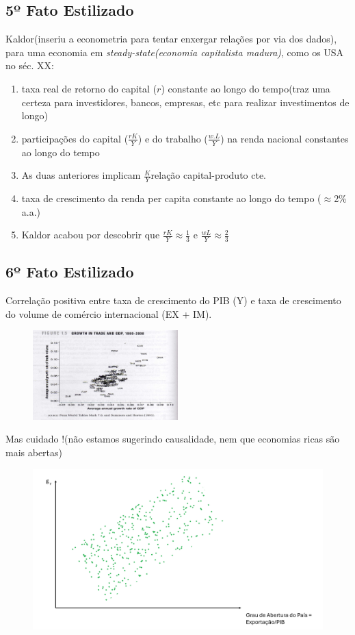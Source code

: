 \documentclass[a4paper,12pt]{article}[abntex2]
\begin{document}
\subsection{\textbf{5º Fato Estilizado}}
Kaldor(inseriu a econometria para tentar enxergar relações por via dos dados), para uma economia em \textit{steady-state(economia capitalista madura)}, como os USA no séc. XX:\begin{enumerate}
    \item taxa real de retorno do capital ($r$) constante ao longo do tempo(traz uma certeza para investidores, bancos, empresas, etc para realizar investimentos de longo)
    \item participações do capital ($\frac{rK}{Y}$) e do trabalho ($\frac{w.L}{Y}$) na renda nacional constantes ao longo do tempo
    \item As duas anteriores implicam $\frac{K}{Y}$relação capital-produto cte.
    \item taxa de crescimento da renda per capita constante ao longo do tempo ($\approx$2\% a.a.)  \item Kaldor acabou por descobrir que $\frac{rK}{Y} \approx\frac{1}{3}$ e $\frac{wL}{Y} \approx\frac{2}{3}$
\end{enumerate}

\subsection{\textbf{6º Fato Estilizado}}
Correlação positiva entre taxa de crescimento do PIB (Y) e taxa de crescimento do volume de comércio internacional (EX + IM).

\begin{figure}[H]
        \centering
        \includegraphics[width=0.5\textwidth]{Imagens/a1i13.png}
\end{figure}

Mas cuidado !(não estamos sugerindo causalidade, nem que economias ricas são mais abertas)

\begin{figure}[H]
    \centering
    \includegraphics[width=0.5\linewidth]{Imagens/a1i21.png}
\end{figure}
\end{document}
